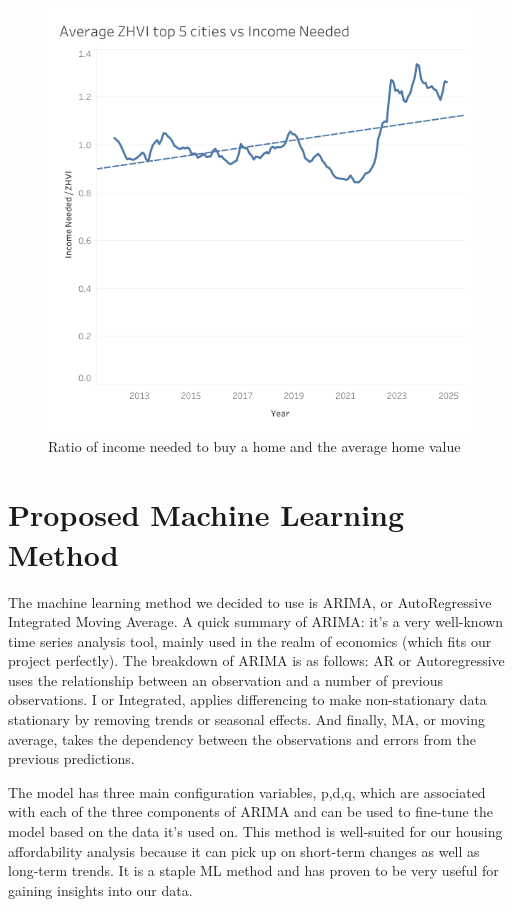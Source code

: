 \documentclass[journal]{IEEEtran}
\begin{document}
\begin{figure}
	\centering
	\includegraphics[width=1\linewidth]{zhvi-income.png}
	\caption{Ratio of income needed to buy a home and the average home value}
	\label{fig:zhvi-income}
\end{figure}

\section{Proposed Machine Learning Method}

The machine learning method we decided to use is ARIMA, or AutoRegressive
Integrated Moving Average. A quick summary of ARIMA: it's a very well-known
time series analysis tool, mainly used in the realm of economics (which fits
our project perfectly). The breakdown of ARIMA is as follows: AR or
Autoregressive uses the relationship between an observation and a number of
previous observations. I or Integrated, applies differencing to make
non-stationary data stationary by removing trends or seasonal effects. And
finally, MA, or moving average, takes the dependency between the observations
and errors from the previous predictions.

The model has three main configuration variables, p,d,q, which are associated
with each of the three components of ARIMA and can be used to fine-tune the
model based on the data it's used on. This method is well-suited for our
housing affordability analysis because it can pick up on short-term changes as
well as long-term trends. It is a staple ML method and has proven to be very
useful for gaining insights into our data.
\end{document}

